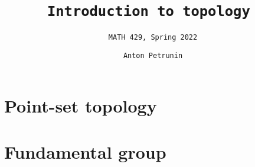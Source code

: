 \documentclass[twoside]{book}
\begin{document}

\title{
\tt Introduction to topology
}
\subtitle{\tt MATH 429, Spring 2022}
\author{\tt Anton Petrunin}
\date{}
\maketitle
\thispagestyle{empty}
\newpage
\tableofcontents


\part{Point-set topology}








\part{Fundamental group}




%
%

\appendix
%

{\footnotesize

}

\end{document}
